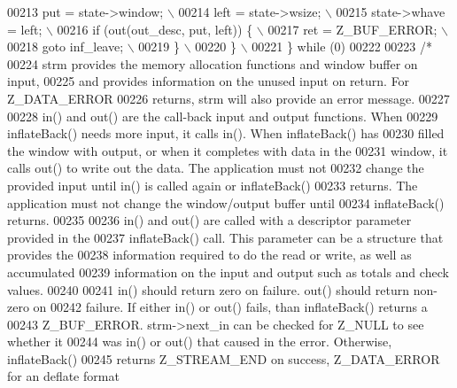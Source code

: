 \begin{DoxyCode}
00213 \textcolor{preprocessor}{            put = state->window; \(\backslash\)}
00214 \textcolor{preprocessor}{            left = state->wsize; \(\backslash\)}
00215 \textcolor{preprocessor}{            state->whave = left; \(\backslash\)}
00216 \textcolor{preprocessor}{            if (out(out\_desc, put, left)) \{ \(\backslash\)}
00217 \textcolor{preprocessor}{                ret = Z\_BUF\_ERROR; \(\backslash\)}
00218 \textcolor{preprocessor}{                goto inf\_leave; \(\backslash\)}
00219 \textcolor{preprocessor}{            \} \(\backslash\)}
00220 \textcolor{preprocessor}{        \} \(\backslash\)}
00221 \textcolor{preprocessor}{    \} while (0)}
00222 
00223 \textcolor{comment}{/*}
00224 \textcolor{comment}{   strm provides the memory allocation functions and window buffer on input,}
00225 \textcolor{comment}{   and provides information on the unused input on return.  For Z\_DATA\_ERROR}
00226 \textcolor{comment}{   returns, strm will also provide an error message.}
00227 \textcolor{comment}{}
00228 \textcolor{comment}{   in() and out() are the call-back input and output functions.  When}
00229 \textcolor{comment}{   inflateBack() needs more input, it calls in().  When inflateBack() has}
00230 \textcolor{comment}{   filled the window with output, or when it completes with data in the}
00231 \textcolor{comment}{   window, it calls out() to write out the data.  The application must not}
00232 \textcolor{comment}{   change the provided input until in() is called again or inflateBack()}
00233 \textcolor{comment}{   returns.  The application must not change the window/output buffer until}
00234 \textcolor{comment}{   inflateBack() returns.}
00235 \textcolor{comment}{}
00236 \textcolor{comment}{   in() and out() are called with a descriptor parameter provided in the}
00237 \textcolor{comment}{   inflateBack() call.  This parameter can be a structure that provides the}
00238 \textcolor{comment}{   information required to do the read or write, as well as accumulated}
00239 \textcolor{comment}{   information on the input and output such as totals and check values.}
00240 \textcolor{comment}{}
00241 \textcolor{comment}{   in() should return zero on failure.  out() should return non-zero on}
00242 \textcolor{comment}{   failure.  If either in() or out() fails, than inflateBack() returns a}
00243 \textcolor{comment}{   Z\_BUF\_ERROR.  strm->next\_in can be checked for Z\_NULL to see whether it}
00244 \textcolor{comment}{   was in() or out() that caused in the error.  Otherwise,  inflateBack()}
00245 \textcolor{comment}{   returns Z\_STREAM\_END on success, Z\_DATA\_ERROR for an deflate format}

\end{DoxyCode}
